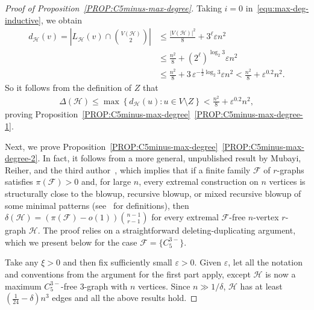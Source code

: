 \documentclass[11pt,a4paper]{article}
\theoremstyle{remark}
\newcommand{\C}[1]{\mathcal{#1}}
\newcommand{\e}{\varepsilon}
\newcommand{\hide}[1]{}
\begin{document}
\begin{proof}[Proof of Proposition~\ref{PROP:C5minus-max-degree}]
    Taking $i = 0$ in~\eqref{equ:max-deg-inductive}, we obtain 
    \begin{align*}
        d_{\mathcal{H}}(v)
        = \left|L_{\mathcal{H}}(v) \cap \binom{V(\C H)}{2}\right|
        & \le \frac{|V(\C H)|^2}{8} + 3^{\ell} \varepsilon n^2  \\
        & \le \frac{n^2}{8} + \left(2^{\ell}\right)^{\log_{2}3} \varepsilon n^2 \\
        & \le \frac{n^2}{8} + 3\,\varepsilon^{-\frac{1}{2}\log_{2}3} \varepsilon n^2
        < \frac{n^2}{8} +  \varepsilon^{0.2} n^2. 
    \end{align*}
    So it follows from the definition of $Z$ that 
    \begin{align*}
        \Delta(\mathcal{H})
        \le \max\left\{d_{\mathcal{H}}(u) \colon u\in V\setminus Z \right\}
        < \frac{n^2}{8} +  \varepsilon^{0.2} n^2, 
    \end{align*}
    proving Proposition~\ref{PROP:C5minus-max-degree}~\ref{PROP:C5minus-max-degree-1}. 

    Next, we prove Proposition~\ref{PROP:C5minus-max-degree}~\ref{PROP:C5minus-max-degree-2}. 
    In fact, it follows from a more general, unpublished result by Mubayi, Reiher, and the third author~\cite{LMR21mindeg}, which implies that if a finite family $\mathcal{F}$ of $r$-graphs satisfies $\pi(\mathcal{F}) > 0$ and, for large $n$, every extremal construction on $n$ vertices is structurally close to the blowup, recursive blowup, or mixed recursive blowup of some minimal patterns (see~\cite{PI14,LP22} for definitions), then $\delta(\mathcal{H}) = \left(\pi(\mathcal{F}) - o(1)\right)\binom{n-1}{r-1}$ for every extremal $\mathcal{F}$-free $n$-vertex $r$-graph $\mathcal{H}$.  
    The proof relies on a straightforward deleting-duplicating argument, which we present below for the case $\mathcal{F} = \{C_{5}^{3-}\}$.

   Take any $\xi>0$ and then fix sufficiently small $\e>0$. Given $\e$, let all the  notation and conventions from the argument for the first part apply, except $\C H$ is now a maximum $C_{5}^{3-}$-free $3$-graph with $n$ vertices. Since $n\gg 1/\delta$, $\C H$ has at least $(\frac1{24}-\delta)n^3$ edges and all the above results hold.

\hide{    
    We may choose $\varepsilon>0$ in the proof above to be small enough that $\varepsilon \ll \xi$. Now, let $\mathcal{H}$ be an $n$-vertex $C_{5}^{3-}$-free $3$-graph with exactly $\mathrm{ex}(n, C_{5}^{3-})$ edges. Note that we can choose $n$ sufficiently large so that $|\mathcal{H}| = \mathrm{ex}(n, C_{5}^{3-}) \ge (1/24 - \delta)n^3$. Therefore, all the conclusions above also hold for the new $3$-graph $\mathcal{H}$. 
}


\end{proof}
\end{document}
